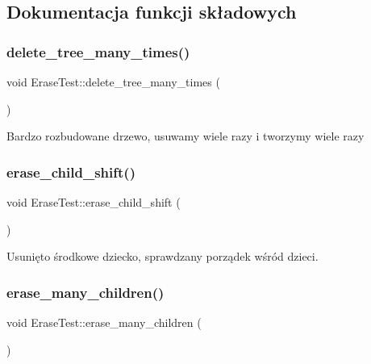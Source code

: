 \subsection{Dokumentacja funkcji składowych}
\mbox{\label{class_erase_test_ac80cbc1c11f5ca0f218f0632b5b368b5}} 
\subsubsection{\texorpdfstring{delete\+\_\+tree\+\_\+many\+\_\+times()}{delete\_tree\_many\_times()}}
{\footnotesize\ttfamily void Erase\+Test\+::delete\+\_\+tree\+\_\+many\+\_\+times (\begin{DoxyParamCaption}{ }\end{DoxyParamCaption})\hspace{0.3cm}{\ttfamily [inline]}}

Bardzo rozbudowane drzewo, usuwamy wiele razy i tworzymy wiele razy \mbox{\label{class_erase_test_a0897542be38d32150b6c080449bf0b2d}} 
\subsubsection{\texorpdfstring{erase\+\_\+child\+\_\+shift()}{erase\_child\_shift()}}
{\footnotesize\ttfamily void Erase\+Test\+::erase\+\_\+child\+\_\+shift (\begin{DoxyParamCaption}{ }\end{DoxyParamCaption})\hspace{0.3cm}{\ttfamily [inline]}}

Usunięto środkowe dziecko, sprawdzany porządek wśród dzieci. \mbox{\label{class_erase_test_a7c3b732833940974b289fd52f1190306}} 
\subsubsection{\texorpdfstring{erase\+\_\+many\+\_\+children()}{erase\_many\_children()}}
{\footnotesize\ttfamily void Erase\+Test\+::erase\+\_\+many\+\_\+children (\begin{DoxyParamCaption}{ }\end{DoxyParamCaption})\hspace{0.3cm}{\ttfamily [inline]}}


